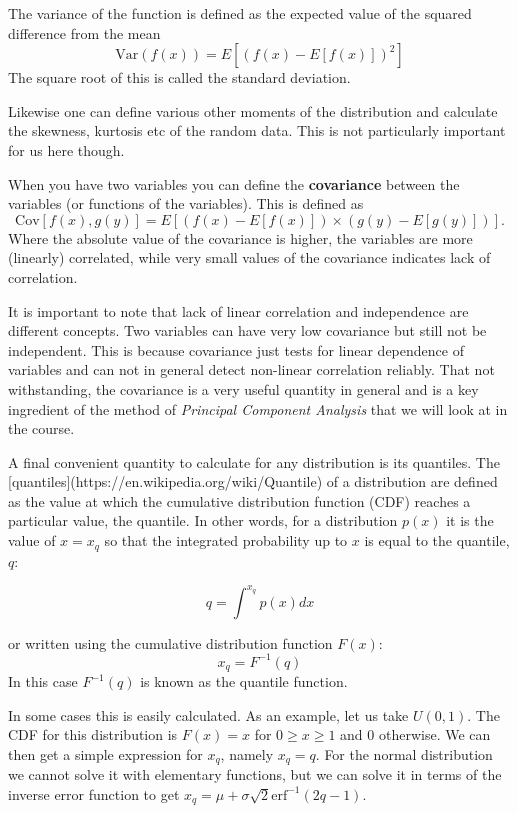 \documentclass[a4paper,10pt]{article}
\begin{document}
The variance of the function is defined as the expected value of the squared difference from the mean
$$\mathrm{Var}(f(x)) = E\left[(f(x)-E\left[f(x)\right])^2\right] $$
The square root of this is called the standard deviation.

Likewise one can define various other moments of the distribution and calculate the skewness, kurtosis etc of the random data. This is not particularly important for us here though.

When you have two variables you can define the \textbf{covariance} between the variables (or functions of the variables). This is defined as
$$\mathrm{Cov}\left[f(x), g(y)\right] = E\left[ \left( f(x) - E\left[f(x)\right] \right) \times \left( g(y) - E\left[g(y)\right] \right)\right]. $$
Where the absolute value of the covariance is higher, the variables are more (linearly) correlated, while very small values of the covariance indicates lack of correlation.

It is important to note that lack of linear correlation and independence are different concepts. Two variables can have very low covariance but still not be independent. This is because covariance just tests for linear dependence of variables and can not in general detect non-linear correlation reliably. That not withstanding, the covariance is a very useful quantity in general and is a key ingredient of the method of \textit{Principal Component Analysis} that we will look at in the course.

A final convenient quantity to calculate for any distribution is its quantiles. The [quantiles](https://en.wikipedia.org/wiki/Quantile) of a distribution are defined as the value at which the cumulative distribution function (CDF) reaches a particular value, the quantile. In other words, for a distribution $p(x)$ it is the value of $x=x_q$ so that the integrated probability up to $x$ is equal to the quantile, $q$:

$$q = \int^{x_q} p(x) dx$$

or written using the cumulative distribution function $F(x)$:
$$x_q = F^{-1}(q)$$
In this case $F^{-1}(q)$ is known as the quantile function. 

In some cases this is easily calculated. As an example, let us take $U(0, 1)$. The CDF for this distribution is $F(x) = x$ for $0\ge x \ge 1$ and 0 otherwise. We can then get a simple expression for $x_q$, namely $x_q = q$. For the normal distribution we cannot solve it with elementary functions, but we can solve it in terms of the inverse error function to get $x_q = \mu + \sigma \sqrt{2}\mathrm{erf}^{-1}(2 q -1)$. 
\end{document}

